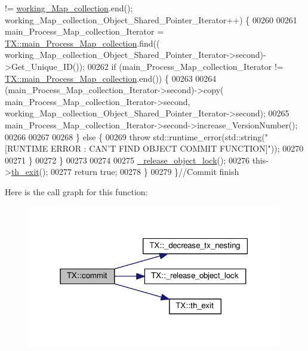 \begin{DoxyCode}
       != \hyperlink{class_t_x_a81aafda16e2f20e36ec6c68e584668ff_a81aafda16e2f20e36ec6c68e584668ff}{working\_Map\_collection}.end(); 
      working\_Map\_collection\_Object\_Shared\_Pointer\_Iterator++) \{
00260             
00261                 main\_Process\_Map\_collection\_Iterator = 
      \hyperlink{class_t_x_a1a45d726894190695314464d7cd97c29_a1a45d726894190695314464d7cd97c29}{TX::main\_Process\_Map\_collection}.find((
      working\_Map\_collection\_Object\_Shared\_Pointer\_Iterator->second)->Get\_Unique\_ID());
00262                 \textcolor{keywordflow}{if} (main\_Process\_Map\_collection\_Iterator != 
      \hyperlink{class_t_x_a1a45d726894190695314464d7cd97c29_a1a45d726894190695314464d7cd97c29}{TX::main\_Process\_Map\_collection}.end()) \{
00263 
00264                     (main\_Process\_Map\_collection\_Iterator->second)->copy(
      main\_Process\_Map\_collection\_Iterator->second, working\_Map\_collection\_Object\_Shared\_Pointer\_Iterator->second);
00265                     main\_Process\_Map\_collection\_Iterator->second->increase\_VersionNumber();
00266 
00267 
00268                 \} \textcolor{keywordflow}{else} \{
00269                     \textcolor{keywordflow}{throw} std::runtime\_error(std::string(\textcolor{stringliteral}{"[RUNTIME ERROR : CAN'T FIND OBJECT COMMIT
       FUNCTION]"}));
00270 
00271                 \}
00272         \}
00273 
00274 
00275         \hyperlink{class_t_x_a4c13d2015dc15d0f788fa9a1413f0463_a4c13d2015dc15d0f788fa9a1413f0463}{\_release\_object\_lock}();
00276         this->\hyperlink{class_t_x_ae045534c4a9d39bd5c6ea2a39a372a79_ae045534c4a9d39bd5c6ea2a39a372a79}{th\_exit}();
00277         \textcolor{keywordflow}{return} \textcolor{keyword}{true};
00278     \}
00279 \}\textcolor{comment}{//Commit finish}
\end{DoxyCode}


Here is the call graph for this function\+:\nopagebreak
\begin{figure}[H]
\begin{center}
\leavevmode
\includegraphics[width=315pt]{class_t_x_a9dde5d356b35e557448e58d260087356_a9dde5d356b35e557448e58d260087356_cgraph}
\end{center}
\end{figure}


